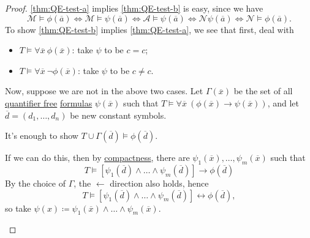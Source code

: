 \begin{proof}
	\autoref{thm:QE-test-a} implies \autoref{thm:QE-test-b} is easy, since we have
	\[
		\mathcal{M} \models \phi (\overline{a} )
		\iff \mathcal{M} \models \psi (\overline{a} )
		\iff \mathcal{A} \models \psi (\overline{a} )
		\iff \mathcal{N} \psi (\overline{a} )
		\iff \mathcal{N} \models \phi (\overline{a} ).
	\]
	To show \autoref{thm:QE-test-b} implies \autoref{thm:QE-test-a}, we see that first, deal with
	\begin{itemize}
		\item \(T \models \forall \overline{x} \ \phi (\overline{x} )\): take \(\psi \) to be \(c = c\);
		\item \(T \models \forall \overline{x} \ \lnot \phi (\overline{x} )\): take \(\psi \) to be \(c \neq c\).
	\end{itemize}
	Now, suppose we are not in the above two cases. Let \(\Gamma (\overline{x} )\) be the set of all \hyperref[not:quantifier-free]{quantifier free} \hyperref[def:formula]{formulas} \(\psi (\overline{x} )\) such that \(T \models \forall \overline{x} \ (\phi (\overline{x} ) \to \psi (\overline{x} ))\), and let \(\overline{d} = (d_1, \ldots , d_n)\) be new constant symbols.
	\begin{claim}
		It's enough to show \(T \cup \Gamma (\overline{d} ) \models \phi (\overline{d} )\).
	\end{claim}
	\begin{explanation}
		If we can do this, then by \hyperref[thm:compactness]{compactness}, there are \(\psi _1(\overline{x}) , \ldots , \psi _m(\overline{x} )\) such that
		\[
			T \models \left[ \psi _1(\overline{d} ) \land \ldots \land \psi _m(\overline{d} ) \right] \to \phi (\overline{d} )
		\]
		By the choice of \(\Gamma \), the \(\gets\) direction also holds, hence
		\[
			T \models \left[ \psi _1(\overline{d} ) \land \ldots \land \psi _m(\overline{d} ) \right] \leftrightarrow \phi (\overline{d} ),
		\]
		so take \(\psi (x) \coloneqq \psi _1(\overline{x} ) \land \ldots \land \psi _m(\overline{x} )\).
	\end{explanation}


\end{proof}
